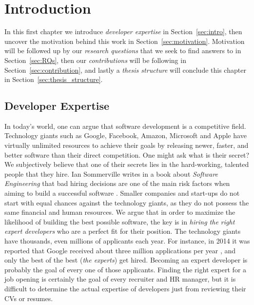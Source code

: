 \chapter{Introduction}

    In this first chapter we introduce \emph{developer expertise} in Section~\ref{sec:intro}, then uncover the motivation behind this work in Section~\ref{sec:motivation}. Motivation will be followed up by our \emph{research questions} that we seek to find answers to in Section~\ref{sec:RQs}, then our \emph{contributions} will be following in Section~\ref{sec:contribution}, and lastly a \emph{thesis structure} will conclude this chapter in Section~\ref{sec:thesis_structure}.
    
    \section{Developer Expertise\label{sec:intro}}
    
        In today's world, one can argue that software development is a competitive field. Technology giants such as Google, Facebook, Amazon, Microsoft and Apple have virtually unlimited resources to achieve their goals by releasing newer, faster, and better software than their direct competition. One might ask what is their secret? We subjectively believe that one of their secrets lies in the hard-working, talented people that they hire. Ian Sommerville writes in a book about \emph{Software Engineering} that bad hiring decisions are one of the main risk factors when aiming to build a successful software \cite{sommerville2016software}. Smaller companies and start-ups do not start with equal chances against the technology giants, as they do not possess the same financial and human resources. We argue that in order to maximize the likelihood of building the best possible software, the key is in \emph{hiring the right expert developers} who are a perfect fit for their position. The technology giants have thousands, even millions of applicants each year. For instance, in 2014 it was reported that Google received about three million applications per year \cite{nisen_2014}, and only the best of the best (\emph{the experts}) get hired. Becoming an expert developer is probably the goal of every one of those applicants. Finding the right expert for a job opening is certainly the goal of every recruiter and HR manager, but it is difficult to determine the actual expertise of developers just from reviewing their CVs or resumes.
    
